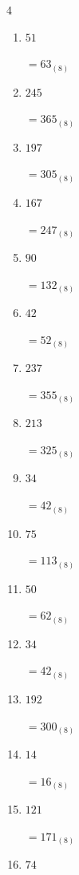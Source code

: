 \begin{multicols}{4}
\begin{enumerate}
        $=115_{(8)}$

  \item $51$

        $=63_{(8)}$

  \item $245$

        $=365_{(8)}$

  \item $197$

        $=305_{(8)}$

  \item $167$

        $=247_{(8)}$

  \item $90$

        $=132_{(8)}$

  \item $42$

        $=52_{(8)}$

\columnbreak %

\resetques

  \item $237$

        $=355_{(8)}$

  \item $213$

        $=325_{(8)}$

  \item $34$

        $=42_{(8)}$

  \item $75$

        $=113_{(8)}$

  \item $50$

        $=62_{(8)}$

  \item $34$

        $=42_{(8)}$

  \item $192$

        $=300_{(8)}$

  \item $14$

        $=16_{(8)}$

  \item $121$

        $=171_{(8)}$

  \item $74$


\end{enumerate}
\end{multicols}

